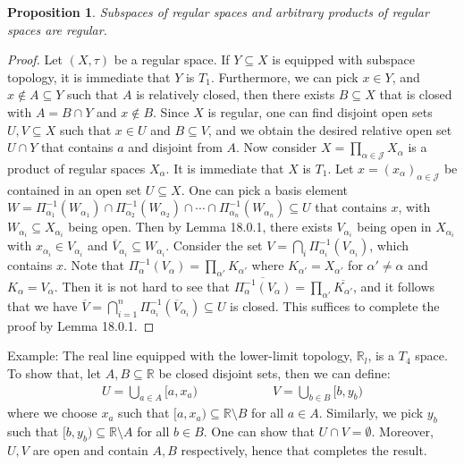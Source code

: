 \documentclass[11pt]{book}
\theoremstyle{break}
\theoremstyle{break}
\newtheorem{prop}[lem]{Proposition}
\newcommand{\R}{\mathbb{R}}
\newcommand{\example}{\color{green}Example: \color{black}}
\begin{document}
\begin{prop}
Subspaces of regular spaces and arbitrary products of regular spaces are regular.
\end{prop}
\begin{proof}
Let $(X,\tau)$ be a regular space. If $Y \subseteq X$ is equipped with subspace topology, it is immediate that $Y$ is $T_1$. Furthermore, we can pick $x \in Y$, and $x \notin A \subseteq Y$ such that $A$ is relatively closed, then there exists $B \subseteq X$ that is closed with $A = B\cap Y$ and $x \notin B$. Since $X$ is regular, one can find disjoint open sets $U,V \subseteq X$ such that $x \in U$ and $B \subseteq V$, and we obtain the desired relative open set $U\cap Y$ that contains $a$ and disjoint from $A$. Now consider $X = \prod_{\alpha \in \mathcal{J}}X_\alpha$ is a product of regular spaces $X_\alpha$. It is immediate that $X$ is $T_1$. Let $x= (x_\alpha)_{\alpha \in \mathcal{J}}$ be contained in an open set $U \subseteq X$. One can pick a basis element $W = \Pi_{\alpha_1}^{-1}(W_{\alpha_1})\cap \Pi_{\alpha_2}^{-1}(W_{\alpha_2})\cap \cdots \cap \Pi_{\alpha_n}^{-1}(W_{\alpha_n}) \subseteq U$ that contains $x$, with $W_{\alpha_{i}} \subseteq X_{\alpha_i}$ being open. Then by Lemma 18.0.1, there exists $V_{\alpha_i}$ being open in $X_{\alpha_i}$ with $x_{\alpha_i}\in V_{\alpha_i}$ and $\overline{V}_{\alpha_i} \subseteq W_{\alpha_i}$. Consider the set $V =\bigcap_i \Pi_{\alpha_i}^{-1}(V_{\alpha_i})$, which contains $x$. Note that $\Pi_{\alpha}^{-1}(V_\alpha) = \prod_{\alpha'}K_{\alpha'}$ where $K_{\alpha'} = X_{\alpha'}$ for $\alpha' \neq \alpha$ and $K_\alpha = V_\alpha$. Then it is not hard to see that $\overline{\Pi_{\alpha}^{-1}(V_\alpha)} = \prod_{\alpha'}\overline{K_{\alpha'}}$, and it follows that we have $\overline{V} = \bigcap_{i=1}^n\Pi_{\alpha_i}^{-1}(\overline{V}_{\alpha_i}) \subseteq U$ is closed. This suffices to complete the proof by Lemma 18.0.1.
\end{proof}


\example The real line equipped with the lower-limit topology, $\R_l$, is a $T_4$ space. To show that, let $A,B \subseteq \R$ be closed disjoint sets, then we can define:
\begin{align*}
U = \bigcup_{a \in A}[a,x_a) \qquad\qquad\qquad V = \bigcup_{b \in B}[b, y_b)
\end{align*}
where we choose $x_a $ such that $[a,x_a) \subseteq \R\setminus B$ for all $a \in A$. Similarly, we pick $y_b$ such that $[b,y_b) \subseteq \R\setminus A$ for all $b \in B$. One can show that $U \cap V = \emptyset$. Moreover, $U,V$ are open and contain $A,B$ respectively, hence that completes the result. \\
\end{document}
